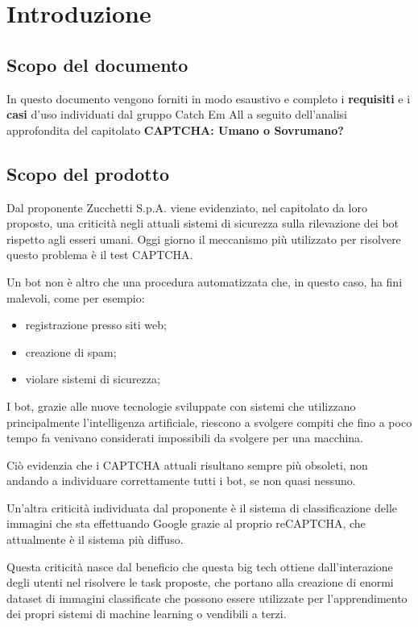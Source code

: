 \section{Introduzione}

\subsection{Scopo del documento}
In questo documento vengono forniti in modo esaustivo e completo i \textbf{requisiti} e i \textbf{casi} d'uso individuati dal gruppo Catch Em All a seguito dell'analisi approfondita del capitolato \textbf{CAPTCHA: Umano o Sovrumano?}

\subsection{Scopo del prodotto}
Dal proponente Zucchetti S.p.A. viene evidenziato, nel capitolato da loro proposto, una criticità negli attuali sistemi di sicurezza sulla rilevazione dei bot rispetto agli esseri umani. Oggi giorno il meccanismo più utilizzato per risolvere questo problema è il test CAPTCHA.

Un bot non è altro che una procedura automatizzata che, in questo caso, ha fini malevoli, come per esempio:
\begin{itemize}
 	\item registrazione presso siti web;
	\item creazione di spam;
	\item violare sistemi di sicurezza;
\end{itemize}
I bot, grazie alle nuove tecnologie sviluppate con sistemi che utilizzano principalmente l'intelligenza artificiale, riescono a svolgere compiti che fino a poco tempo fa venivano considerati impossibili da svolgere per una macchina.

Ciò evidenzia che i CAPTCHA attuali risultano sempre più obsoleti, non andando a individuare correttamente tutti i bot, se non quasi nessuno.

Un'altra criticità individuata dal proponente è il sistema di classificazione delle immagini che sta effettuando Google grazie al proprio reCAPTCHA, che attualmente è il sistema più diffuso.

Questa criticità nasce dal beneficio che questa big tech ottiene dall'interazione degli utenti nel risolvere le task proposte, che portano alla creazione di enormi dataset di immagini classificate che possono essere utilizzate per l'apprendimento dei propri sistemi di machine learning o vendibili a terzi.

